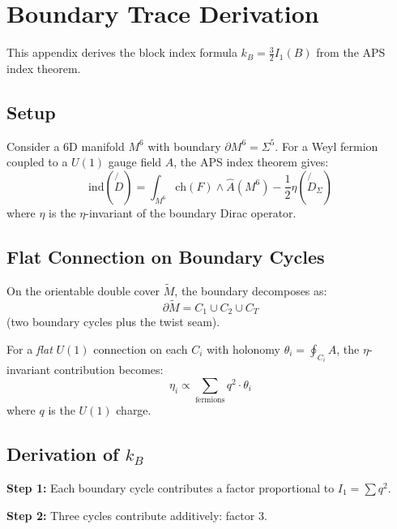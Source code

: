 \section{Boundary Trace Derivation}
\label{app:boundary}

This appendix derives the block index formula $k_B = \frac{3}{2} I_1(B)$ from 
the APS index theorem.

\subsection{Setup}

Consider a 6D manifold $M^6$ with boundary $\partial M^6 = \Sigma^5$. For a 
Weyl fermion coupled to a $U(1)$ gauge field $A$, the APS index theorem gives:
\begin{equation}
    \text{ind}(\not{\!D}) = \int_{M^6} \text{ch}(F) \wedge \hat{A}(M^6) 
    - \frac{1}{2}\eta(\not{\!D}_\Sigma)
\end{equation}
where $\eta$ is the $\eta$-invariant of the boundary Dirac operator.

\subsection{Flat Connection on Boundary Cycles}

On the orientable double cover $\widetilde{M}$, the boundary decomposes as:
\begin{equation}
    \partial\widetilde{M} = C_1 \cup C_2 \cup C_T
\end{equation}
(two boundary cycles plus the twist seam).

For a \emph{flat} $U(1)$ connection on each $C_i$ with holonomy $\theta_i = \oint_{C_i} A$, 
the $\eta$-invariant contribution becomes:
\begin{equation}
    \eta_i \propto \sum_{\text{fermions}} q^2 \cdot \theta_i
\end{equation}
where $q$ is the $U(1)$ charge.

\subsection{Derivation of $k_B$}

\textbf{Step 1:} Each boundary cycle contributes a factor proportional to $I_1 = \sum q^2$.

\textbf{Step 2:} Three cycles contribute additively: factor 3.


